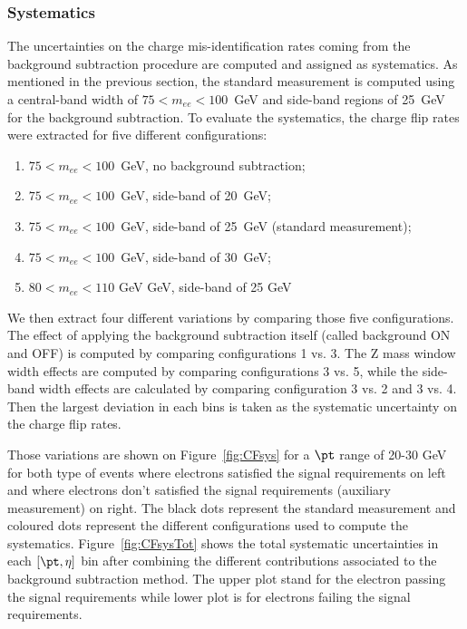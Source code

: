 

\subsubsection{Systematics}
\label{subsec:CFsysSection}

The uncertainties on the charge mis-identification rates coming from the background subtraction procedure are computed and assigned as systematics. As mentioned in the previous section, the standard measurement is computed using a central-band width of $75<m_{ee}<100$~GeV and side-band regions of 25~GeV for the background subtraction. To evaluate the systematics, the charge flip rates were extracted for five different configurations: 
\begin{enumerate}
\item $75<m_{ee}<100$~GeV, no background subtraction; 
\item $75<m_{ee}<100$~GeV, side-band of 20~GeV;
\item $75<m_{ee}<100$~GeV, side-band of 25~GeV (standard measurement);
\item $75<m_{ee}<100$~GeV, side-band of 30~GeV; 
\item $80<m_{ee}<110$ GeV GeV, side-band of 25 GeV
\end{enumerate}
We then extract four different variations by comparing those five configurations. The effect of applying the background subtraction itself (called background ON and OFF) is computed by comparing configurations 1 vs. 3. The Z mass window width effects are computed by comparing configurations 3 vs. 5, while the side-band width effects are calculated by comparing configuration 3 vs. 2 and 3 vs. 4. Then the largest deviation in each bins is taken as the systematic uncertainty on the charge flip rates. 

Those variations are shown on Figure~\ref{fig:CFsys} for a $\pt$ range of 20-30 GeV for both type of events where electrons satisfied the signal requirements on left and where electrons don't satisfied the signal requirements (auxiliary measurement) on right. The black dots represent the standard measurement and coloured dots represent the different configurations used to compute the systematics. Figure~\ref{fig:CFsysTot} shows the total systematic uncertainties in each $[\pt,\eta]$ bin after combining the different contributions associated to the background subtraction method. The upper plot stand for the electron passing the signal requirements while lower plot is for electrons failing the signal requirements.


